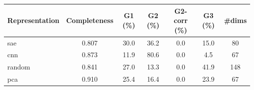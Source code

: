 \begin{tabular}{lcccccc}
\toprule
Representation & Completeness & G1 (\%) & G2 (\%) & G2-corr (\%) & G3 (\%) & \#dims \\
\midrule
sae & 0.807 & 30.0 & 36.2 & 0.0 & 15.0 & 80 \\
cnn & 0.873 & 11.9 & 80.6 & 0.0 & 4.5 & 67 \\
random & 0.841 & 27.0 & 13.3 & 0.0 & 41.9 & 148 \\
pca & 0.910 & 25.4 & 16.4 & 0.0 & 23.9 & 67 \\
\bottomrule
\end{tabular}